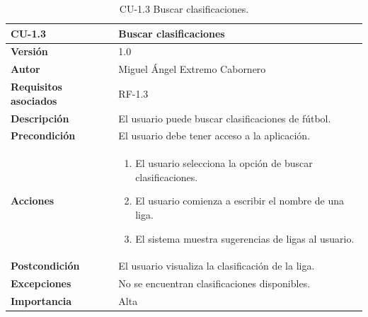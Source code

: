 \begin{table}[p]
    \centering
    \begin{tabularx}{\linewidth}{ p{} p{} }
        \toprule
        \textbf{CU-1.3}    & \textbf{Buscar clasificaciones}\\
        \toprule
        \textbf{Versión}              & 1.0    \\
        \textbf{Autor}                & Miguel Ángel Extremo Cabornero \\
        \textbf{Requisitos asociados} & RF-1.3 \\
        \textbf{Descripción}          & El usuario puede buscar clasificaciones de fútbol. \\
        \textbf{Precondición}         & El usuario debe tener acceso a la aplicación. \\
        \textbf{Acciones}             &
        \begin{enumerate}
            \item El usuario selecciona la opción de buscar clasificaciones.
            \item El usuario comienza a escribir el nombre de una liga.
            \item El sistema muestra sugerencias de ligas al usuario.
        \end{enumerate}\\
        \textbf{Postcondición}        & El usuario visualiza la clasificación de la liga. \\
        \textbf{Excepciones}          & No se encuentran clasificaciones disponibles. \\
        \textbf{Importancia}          & Alta \\
        \bottomrule
    \end{tabularx}
    \caption{CU-1.3 Buscar clasificaciones.}
\end{table}

